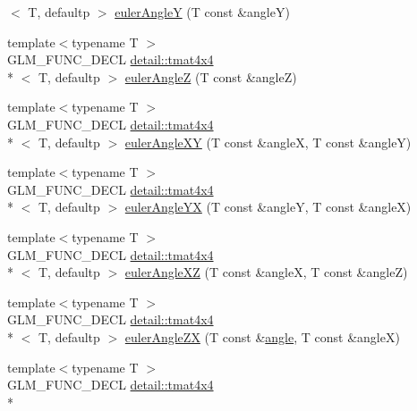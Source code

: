 \begin{DoxyCompactItemize}
$<$ T, defaultp $>$ \hyperlink{group__gtx__euler__angles_gacdc188a23a928d57d4490ff7d646fb96}{euler\-Angle\-Y} (T const \&angle\-Y)
\item 
{\footnotesize template$<$typename T $>$ }\\G\-L\-M\-\_\-\-F\-U\-N\-C\-\_\-\-D\-E\-C\-L \hyperlink{structglm_1_1detail_1_1tmat4x4}{detail\-::tmat4x4}\\*
$<$ T, defaultp $>$ \hyperlink{group__gtx__euler__angles_gaf55b28c29ebd7ba728f1ad6490c89687}{euler\-Angle\-Z} (T const \&angle\-Z)
\item 
{\footnotesize template$<$typename T $>$ }\\G\-L\-M\-\_\-\-F\-U\-N\-C\-\_\-\-D\-E\-C\-L \hyperlink{structglm_1_1detail_1_1tmat4x4}{detail\-::tmat4x4}\\*
$<$ T, defaultp $>$ \hyperlink{group__gtx__euler__angles_ga83a52d36fd752c92ce189197b51ea785}{euler\-Angle\-X\-Y} (T const \&angle\-X, T const \&angle\-Y)
\item 
{\footnotesize template$<$typename T $>$ }\\G\-L\-M\-\_\-\-F\-U\-N\-C\-\_\-\-D\-E\-C\-L \hyperlink{structglm_1_1detail_1_1tmat4x4}{detail\-::tmat4x4}\\*
$<$ T, defaultp $>$ \hyperlink{group__gtx__euler__angles_ga7599a8aaf3bf33b15517dd522a6d8020}{euler\-Angle\-Y\-X} (T const \&angle\-Y, T const \&angle\-X)
\item 
{\footnotesize template$<$typename T $>$ }\\G\-L\-M\-\_\-\-F\-U\-N\-C\-\_\-\-D\-E\-C\-L \hyperlink{structglm_1_1detail_1_1tmat4x4}{detail\-::tmat4x4}\\*
$<$ T, defaultp $>$ \hyperlink{group__gtx__euler__angles_ga61110cb520fbf21dd541cf4e25d81a65}{euler\-Angle\-X\-Z} (T const \&angle\-X, T const \&angle\-Z)
\item 
{\footnotesize template$<$typename T $>$ }\\G\-L\-M\-\_\-\-F\-U\-N\-C\-\_\-\-D\-E\-C\-L \hyperlink{structglm_1_1detail_1_1tmat4x4}{detail\-::tmat4x4}\\*
$<$ T, defaultp $>$ \hyperlink{group__gtx__euler__angles_ga5766bbe3f5b17b5c33ed21b2933ff278}{euler\-Angle\-Z\-X} (T const \&\hyperlink{group__gtc__quaternion_ga23a3fc7ada5bbb665ff84c92c6e0542c}{angle}, T const \&angle\-X)
\item 
{\footnotesize template$<$typename T $>$ }\\G\-L\-M\-\_\-\-F\-U\-N\-C\-\_\-\-D\-E\-C\-L \hyperlink{structglm_1_1detail_1_1tmat4x4}{detail\-::tmat4x4}\\*

\end{DoxyCompactItemize}
